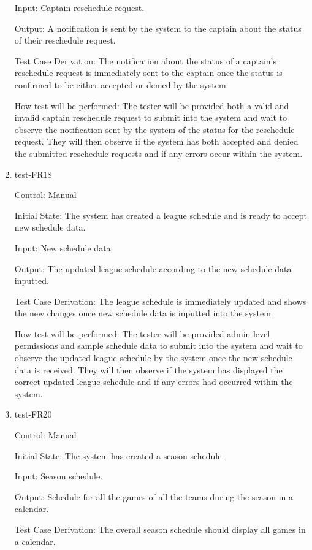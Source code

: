 \documentclass[12pt, titlepage]{article}
\begin{document}
\begin{enumerate}
  Input: Captain reschedule request.

  Output: A notification is sent by the system to the captain about the status of their
  reschedule request.

  Test Case Derivation: The notification about the status of a captain's reschedule
  request is immediately sent to the captain once the status is confirmed to be either
  accepted or denied by the system.

  How test will be performed: The tester will be provided both a valid and invalid captain
  reschedule request to submit into the system and wait to observe the notification sent
  by the system of the status for the reschedule request. They will then observe if the
  system has both accepted and denied the submitted reschedule requests and if any errors
  occur within the system. 

  \item{test-FR18\\}

  Control: Manual

  Initial State: The system has created a league schedule and is ready to
  accept new schedule data.

  Input: New schedule data.

  Output: The updated league schedule according to the new schedule data inputted.

  Test Case Derivation: The league schedule is immediately updated and shows the new changes
  once new schedule data is inputted into the system.

  How test will be performed: The tester will be provided admin level permissions and sample
  schedule data to submit into the system and wait to observe the updated league schedule
  by the system once the new schedule data is received. They will then observe if the
  system has displayed the correct updated league schedule and if any errors had
  occurred within the system.

  \item{test-FR20\\}

  Control: Manual

  Initial State: The system has created a season schedule.

  Input: Season schedule.

  Output: Schedule for all the games of all the teams during the season in a calendar. 

  Test Case Derivation: The overall season schedule should display all games in a calendar.


\end{enumerate}
\end{document}
